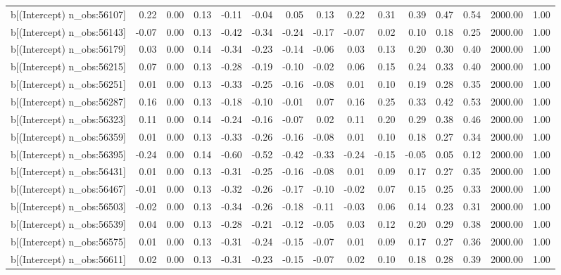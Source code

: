 \begin{table}[ht]
\begin{tabular}{rrrrrrrrrrrrrrr}
  b[(Intercept) n\_obs:56107] & 0.22 & 0.00 & 0.13 & -0.11 & -0.04 & 0.05 & 0.13 & 0.22 & 0.31 & 0.39 & 0.47 & 0.54 & 2000.00 & 1.00 \\ 
  b[(Intercept) n\_obs:56143] & -0.07 & 0.00 & 0.13 & -0.42 & -0.34 & -0.24 & -0.17 & -0.07 & 0.02 & 0.10 & 0.18 & 0.25 & 2000.00 & 1.00 \\ 
  b[(Intercept) n\_obs:56179] & 0.03 & 0.00 & 0.14 & -0.34 & -0.23 & -0.14 & -0.06 & 0.03 & 0.13 & 0.20 & 0.30 & 0.40 & 2000.00 & 1.00 \\ 
  b[(Intercept) n\_obs:56215] & 0.07 & 0.00 & 0.13 & -0.28 & -0.19 & -0.10 & -0.02 & 0.06 & 0.15 & 0.24 & 0.33 & 0.40 & 2000.00 & 1.00 \\ 
  b[(Intercept) n\_obs:56251] & 0.01 & 0.00 & 0.13 & -0.33 & -0.25 & -0.16 & -0.08 & 0.01 & 0.10 & 0.19 & 0.28 & 0.35 & 2000.00 & 1.00 \\ 
  b[(Intercept) n\_obs:56287] & 0.16 & 0.00 & 0.13 & -0.18 & -0.10 & -0.01 & 0.07 & 0.16 & 0.25 & 0.33 & 0.42 & 0.53 & 2000.00 & 1.00 \\ 
  b[(Intercept) n\_obs:56323] & 0.11 & 0.00 & 0.14 & -0.24 & -0.16 & -0.07 & 0.02 & 0.11 & 0.20 & 0.29 & 0.38 & 0.46 & 2000.00 & 1.00 \\ 
  b[(Intercept) n\_obs:56359] & 0.01 & 0.00 & 0.13 & -0.33 & -0.26 & -0.16 & -0.08 & 0.01 & 0.10 & 0.18 & 0.27 & 0.34 & 2000.00 & 1.00 \\ 
  b[(Intercept) n\_obs:56395] & -0.24 & 0.00 & 0.14 & -0.60 & -0.52 & -0.42 & -0.33 & -0.24 & -0.15 & -0.05 & 0.05 & 0.12 & 2000.00 & 1.00 \\ 
  b[(Intercept) n\_obs:56431] & 0.01 & 0.00 & 0.13 & -0.31 & -0.25 & -0.16 & -0.08 & 0.01 & 0.09 & 0.17 & 0.27 & 0.35 & 2000.00 & 1.00 \\ 
  b[(Intercept) n\_obs:56467] & -0.01 & 0.00 & 0.13 & -0.32 & -0.26 & -0.17 & -0.10 & -0.02 & 0.07 & 0.15 & 0.25 & 0.33 & 2000.00 & 1.00 \\ 
  b[(Intercept) n\_obs:56503] & -0.02 & 0.00 & 0.13 & -0.34 & -0.26 & -0.18 & -0.11 & -0.03 & 0.06 & 0.14 & 0.23 & 0.31 & 2000.00 & 1.00 \\ 
  b[(Intercept) n\_obs:56539] & 0.04 & 0.00 & 0.13 & -0.28 & -0.21 & -0.12 & -0.05 & 0.03 & 0.12 & 0.20 & 0.29 & 0.38 & 2000.00 & 1.00 \\ 
  b[(Intercept) n\_obs:56575] & 0.01 & 0.00 & 0.13 & -0.31 & -0.24 & -0.15 & -0.07 & 0.01 & 0.09 & 0.17 & 0.27 & 0.36 & 2000.00 & 1.00 \\ 
  b[(Intercept) n\_obs:56611] & 0.02 & 0.00 & 0.13 & -0.31 & -0.23 & -0.15 & -0.07 & 0.02 & 0.10 & 0.18 & 0.28 & 0.39 & 2000.00 & 1.00 \\ 

\end{tabular}
\end{table}
